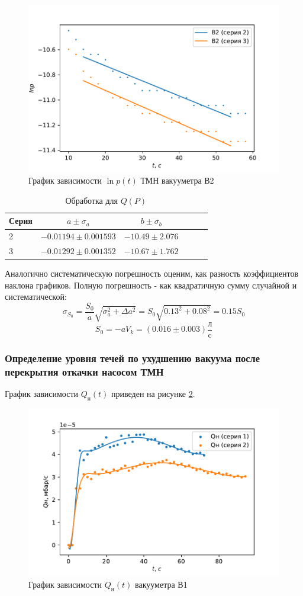 \documentclass[12pt,a4paper]{article}
\begin{document}
\begin{figure}[H]
	\caption{График зависимости $\ln{p}(t)$ ТМН вакууметра В2}
	\label{fig:TMHlnB2(t)}
	\centering
	\includegraphics[width = 11 cm]{res/TMHlnB2(t).pdf}
\end{figure}
\begin{table}[H]	
	\caption{Обработка для $Q(P)$}
	\label{tab:TMHlnB2(t)}
	\centering
	\footnotesize
	\begin{tabular}{lccccc}
		\toprule
		
		Серия & $a \pm \sigma_a$ & $b \pm \sigma_b$ \\
		\midrule
		2 & $-0.01194 \pm 0.001593$     &    $-10.49 \pm 2.076$ \\ 
		3 & $-0.01292 \pm 0.001352$     &    $-10.67 \pm 1.762$ \\ 
		\bottomrule
	\end{tabular}
\end{table}

Аналогично систематическую погрешность оценим, как разность коэффициентов наклона графиков. Полную погрешность - как квадратичную сумму случайной и систематической:
$$	\sigma_{S_0} = \frac{S_0}{a}\sqrt{\sigma_{a}^2 + \Delta a^2} = S_0 \sqrt{0.13^2 + 0.08^2} = 0.15 S_0$$
$$S_0 = -a V_k = (0.016 \pm 0.003) \frac{\text{л}}{\text{c}}$$

\subsubsection*{Определение уровня течей по ухудшению вакуума после перекрытия откачки насосом ТМН}
График зависимости $Q_{\text{н}}(t)$ приведен на рисунке \ref{fig:Q(t)}. 
\begin{figure}[H]
	\caption{График зависимости $Q_{\text{н}}(t)$ вакууметра В1}
	\label{fig:Q(t)}
	\centering
	\includegraphics[width = 11 cm]{res/Q(t).pdf}
\end{figure}
\end{document}
